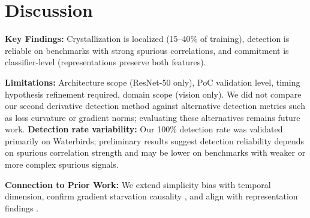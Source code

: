 \section{Discussion}

\textbf{Key Findings:} Crystallization is localized (15--40\% of training), detection is reliable on benchmarks with strong spurious correlations, and commitment is classifier-level (representations preserve both features).

\textbf{Limitations:} Architecture scope (ResNet-50 only), PoC validation level, timing hypothesis refinement required, domain scope (vision only). We did not compare our second derivative detection method against alternative detection metrics such as loss curvature or gradient norms; evaluating these alternatives remains future work. \textbf{Detection rate variability:} Our 100\% detection rate was validated primarily on Waterbirds; preliminary results suggest detection reliability depends on spurious correlation strength and may be lower on benchmarks with weaker or more complex spurious signals.

\textbf{Connection to Prior Work:} We extend simplicity bias \citep{shah2020simplicity} with temporal dimension, confirm gradient starvation causality \citep{pezeshki2021gradient}, and align with representation findings \citep{kirichenko2023last}.
